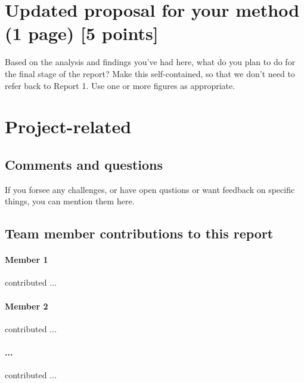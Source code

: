 \documentclass[11pt,a4paper]{article}
\begin{document}
\clearpage
\section{Updated proposal for your method (1 page) [5 points]}
Based on the analysis and findings you've had here, what do you plan to do for the final stage of the report? Make this self-contained, so that we don't need to refer back to Report 1. Use one or more figures as appropriate.

\clearpage
\section{Project-related}

\subsection{Comments and questions}
If you forsee any challenges, or have open qustions or want feedback on specific things, you can mention them here.


\subsection{Team member contributions to this report}
\paragraph{Member 1} contributed ...

\paragraph{Member 2} contributed ...

\paragraph{...} contributed ...





\end{document}
